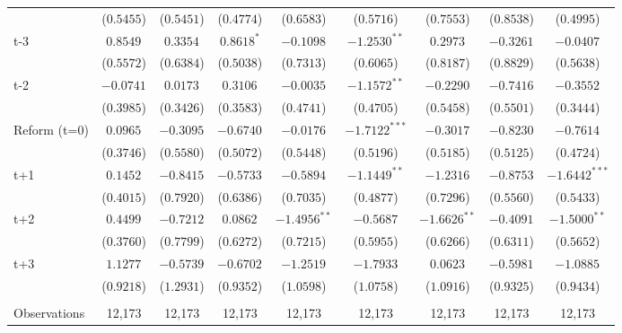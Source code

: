 \begin{landscape}
\begin{table}[htbp]
{\begin{tabular}{lcccccccc}
&     ($0.5455$) &     ($0.5451$) & ($0.4774$)& ($ 0.6583$)  &    ($0.5716$)   &   ($0.7553$) &    ($0.8538$)   &   ($0.4995$) \\
t-3 &     $ 0.8549^{} $ &     $ 0.3354^{} $ &  $ 0.8618^{*} $  &  $ -0.1098^{} $  &     $ -1.2530^{**} $ &     $ 0.2973^{} $ & $ -0.3261^{} $ & $ -0.0407^{} $   \\
&     ($0.5572$) &     ($0.6384$) & ($0.5038$)& ($ 0.7313$)  &    ($0.6065$)   &   ($0.8187$) &    ($0.8829$)   &   ($0.5638$) \\
t-2 &     $ -0.0741^{} $ &     $ 0.0173^{} $ &  $ 0.3106^{} $  &  $ -0.0035^{} $  &     $ -1.1572^{**} $ &     $ -0.2290^{} $ & $ -0.7416^{} $ & $ -0.3552^{} $   \\
&     ($0.3985$) &     ($0.3426$) & ($0.3583$)& ($ 0.4741$)  &    ($0.4705$)   &   ($0.5458$) &    ($0.5501$)   &   ($0.3444$) \\
Reform (t=0) &     $ 0.0965^{} $ &     $ -0.3095^{} $ &   $ -0.6740^{} $   &   $ -0.0176^{} $  &     $ -1.7122^{***} $ &     $ -0.3017^{} $ & $ -0.8230^{} $ & $ -0.7614^{} $   \\
&     ($0.3746$) &     ($0.5580$) & ($0.5072$)& ($ 0.5448$)  &    ($0.5196$)   &   ($0.5185$) &    ($0.5125$)   &   ($0.4724$) \\
t+1 &     $ 0.1452^{} $ &     $ -0.8415^{} $ &    $ -0.5733^{} $ &    $ -0.5894^{} $ &     $ -1.1449^{**} $ &     $ -1.2316^{} $  & $ -0.8753^{} $ & $ -1.6442^{***} $   \\
&     ($0.4015$) &     ($0.7920$) & ($0.6386$)& ($ 0.7035$)  &    ($0.4877$)   &   ($0.7296$) &    ($0.5560$)   &   ($0.5433$) \\
t+2 &     $ 0.4499^{} $ &     $ -0.7212^{} $ &    $ 0.0862^{} $ &    $ -1.4956^{**} $ &     $ -0.5687^{} $ &     $ -1.6626^{**} $  & $ -0.4091^{} $ & $ -1.5000^{**} $   \\
&     ($0.3760$) &     ($0.7799$) & ($0.6272$)& ($ 0.7215$)  &    ($0.5955$)   &   ($0.6266$) &    ($0.6311$)   &   ($0.5652$) \\
t+3 &     $ 1.1277^{} $ &     $ -0.5739^{} $ &    $ -0.6702^{} $ &    $ -1.2519^{} $ &     $ -1.7933^{} $ &     $ 0.0623^{} $  & $ -0.5981^{} $ & $ -1.0885^{} $   \\
&     ($0.9218$) &     ($1.2931$) & ($0.9352$)& ($ 1.0598$)  &    ($1.0758$)   &   ($1.0916$) &    ($0.9325$)   &   ($0.9434$) \\
\\
\addlinespace
Observations       &             12,173    &             12,173    &          12,173      &          12,173  &             12,173    &             12,173  &             12,173    &             12,173   \\

\end{tabular}}
\end{table}
\end{landscape}
